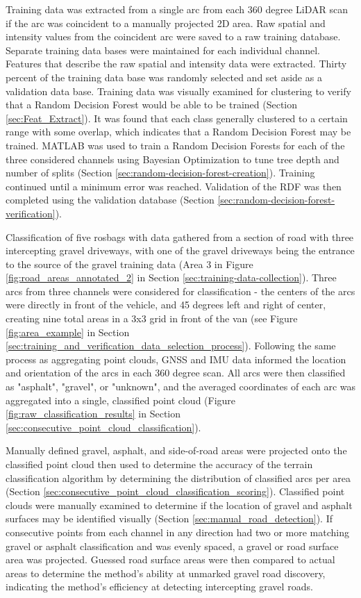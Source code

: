 \documentclass[numbered,pdftex]{ohio-etd}
\begin{document}
{		{Training data was extracted from a single arc from each 360 degree LiDAR scan if the arc was coincident to a manually projected 2D area. Raw spatial and intensity values from the coincident arc were saved to a raw training database. Separate training data bases were maintained for each individual channel. Features that describe the raw spatial and intensity data were extracted. Thirty percent of the training data base was randomly selected and set aside as a validation data base. Training data was visually examined for clustering to verify that a Random Decision Forest would be able to be trained (Section \ref{sec:Feat_Extract}). It was found that each class generally clustered to a certain range with some overlap, which indicates that a Random Decision Forest may be trained. MATLAB was used to train a Random Decision Forests for each of the three considered channels using Bayesian Optimization to tune tree depth and number of splits (Section \ref{sec:random-decision-forest-creation}). Training continued until a minimum error was reached. Validation of the RDF was then completed using the validation database (Section \ref{sec:random-decision-forest-verification}).}
		
		{Classification of five rosbags with data gathered from a section of road with three intercepting gravel driveways, with one of the gravel driveways being the entrance to the source of the gravel training data (Area $3$ in Figure \ref{fig:road_areas_annotated_2} in Section \ref{sec:training-data-collection}). Three arcs from three channels were considered for classification - the centers of the arcs were directly in front of the vehicle, and 45 degrees left and right of center, creating nine total areas in a 3x3 grid in front of the van (see Figure \ref{fig:area_example} in Section \ref{sec:training_and_verification_data_selection_process}). Following the same process as aggregating point clouds, GNSS and IMU data informed the location and orientation of the arcs in each 360 degree scan. All arcs were then classified as "asphalt", "gravel", or "unknown", and the averaged coordinates of each arc was aggregated into a single, classified point cloud (Figure \ref{fig:raw_classification_results} in Section \ref{sec:consecutive_point_cloud_classification}).}
		
		{Manually defined gravel, asphalt, and side-of-road areas were projected onto the classified point cloud then used to determine the accuracy of the terrain classification algorithm by determining the distribution of classified arcs per area (Section \ref{sec:consecutive_point_cloud_classification_scoring}). Classified point clouds were manually examined to determine if the location of gravel and asphalt surfaces may be identified visually (Section \ref{sec:manual_road_detection}). If consecutive points from each channel in any direction had two or more matching gravel or asphalt classification and was evenly spaced, a gravel or road surface area was projected. Guessed road surface areas were then compared to actual areas to determine the method's ability at unmarked gravel road discovery, indicating the method's efficiency at detecting intercepting gravel roads.}
		
}
\end{document}
